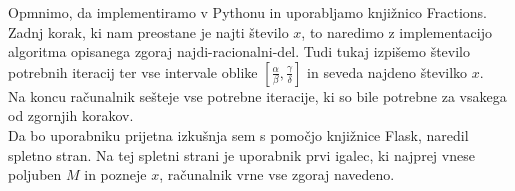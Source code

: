 \documentclass[a4paper,14pt]{article}
\theoremstyle{definition} %
\theoremstyle{plain} %
\begin{document}
Opmnimo, da implementiramo v Pythonu in uporabljamo knjižnico Fractions.\\

Zadnj korak, ki nam preostane je najti število $x$, to naredimo z implementacijo algoritma opisanega zgoraj najdi-racionalni-del.
Tudi tukaj izpišemo število potrebnih iteracij ter vse intervale oblike $\left[ \frac{\alpha}{\beta}, \frac{\gamma}{\delta}\right]$ in seveda najdeno številko $x$.\\

Na koncu računalnik sešteje vse potrebne iteracije, ki so bile potrebne za vsakega od zgornjih korakov.\\

Da bo uporabniku prijetna izkušnja sem s pomočjo knjižnice Flask, naredil spletno stran.
Na tej spletni strani je uporabnik prvi igalec, ki najprej vnese poljuben $M$ in pozneje $x$, računalnik vrne 
vse zgoraj navedeno.
\end{document}
